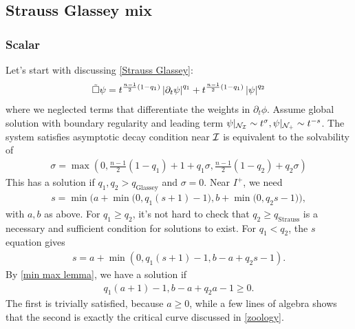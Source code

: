 \documentclass[11pt, oneside]{amsart}
\begin{document}
	\subsection{Strauss Glassey mix}
	\subsubsection{Scalar}
	Let's start with discussing \eqref{Strauss Glassey}:
	\begin{equation*}
		\begin{gathered}
			\tilde{\Box}\psi=t^{\frac{n-1}{2}(1-q_1)}\left\lvert \partial_t\psi\right\rvert^{q_1}+t^{\frac{n-1}{2}(1-q_1)}\left\lvert \psi\right\rvert^{q_2}
		\end{gathered}
	\end{equation*}
	where we neglected terms that differentiate the weights in $\partial_t\phi$. Assume global solution with boundary regularity and leading term $\psi|_{\mathcal{N}_{\mathcal{I}}}\sim t^{\sigma},\psi|_{\mathcal{N}_+}\sim t^{-s}$. The system satisfies asymptotic decay condition near $\mathcal{I}$ is equivalent to the solvability of
	\begin{equation*}
		\begin{gathered}
			\sigma=\max(0,\frac{n-1}{2}(1-q_1)+1+q_1\sigma,\frac{n-1}{2}(1-q_2)+q_2\sigma)
		\end{gathered}
	\end{equation*}
	This has a solution if $q_1,q_2>q_{\text{Glassey}}$ and $\sigma=0$. Near $I^+$, we need
	\begin{equation*}
		\begin{gathered}
			s=\min\bigg(a+\min\big(0,q_1(s+1)-1\big),b+\min\big(0,q_2s-1\big)\bigg),
		\end{gathered}
	\end{equation*}
	with $a,b$ as above. For $q_1\geq q_2$, it's not hard to check that $q_2\geq q_{\text{Strauss}}$ is a necessary and sufficient condition for solutions to exist. For $q_1<q_2$, the $s$ equation gives
	\begin{equation*}
		\begin{gathered}
			s=a+\min(0,q_1(s+1)-1,b-a+q_2s-1).
		\end{gathered}
	\end{equation*}
	By \cref{min max lemma}, we have a solution if \begin{equation*}
		\begin{gathered}
			q_1(a+1)-1,b-a+q_2a-1\geq0.
		\end{gathered}
	\end{equation*}
	The first is trivially satisfied, because $a\geq0$, while a few lines of algebra shows that the second is exactly the critical curve discussed in \cref{zoology}.
	
\end{document}
